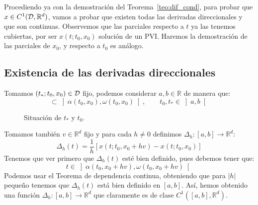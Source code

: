 \noindent
Procediendo ya con la demostración del Teorema~\ref{teo:dif_cond}, para probar que $x\in C^1(\mathcal{D},\mathbb{R}^d)$, vamos a probar que existen todas las derivadas direccionales y que son continuas. Observemos que las parciales respecto a $t$ ya las tenemos cubiertas, por ser $x(t;t_0,x_0)$ solución de un PVI. Haremos la demostración de las parciales de $x_0$, y respecto a $t_0$ es análogo.

\subsection{Existencia de las derivadas direccionales}
\noindent
Tomamos $(t_\ast;t_0,x_0)\in \mathcal{D}$ fijo, podemos considerar $a,b\in \mathbb{R}$ de manera que:
\begin{equation*}
    [a,b] \subset \left]\alpha(t_0,x_0),\omega(t_0,x_0)\right[, \qquad t_0,t_\ast \in \left]a,b\right[
\end{equation*}
\begin{figure}[H]
    \centering
    \caption{Situación de $t_\ast$ y $t_0$.}
    \label{fig:dem_global}
\end{figure}
\noindent
Tomamos también $v\in \mathbb{R}^d$ fijo y para cada $h\neq 0$ definimos $\Delta_h:[a,b]\to \mathbb{R}^d$:
\begin{equation*}
    \Delta_h(t) = \frac{1}{h}[x(t;t_0,x_0+hv) - x(t;t_0,x_0)]
\end{equation*}
Tenemos que ver primero que $\Delta_h(t)$ esté bien definido, pues debemos tener que:
\begin{equation*}
    t\in \left]\alpha(t_0,x_0+hv),\omega(t_0,x_0+hv)\right[
\end{equation*}
Podemos usar el Teorema de dependencia continua, obteniendo que para $|h|$ pequeño tenemos que $\Delta_h(t)$ está bien definido en $[a,b]$. Así, hemos obtenido una función $\Delta_h:[a,b]\to \mathbb{R}^d$ que claramente es de clase $C^1([a,b],\mathbb{R}^d)$.\\


